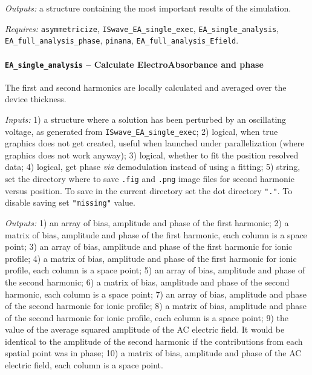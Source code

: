 		\textit{Outputs:} a structure containing the most important results of the simulation.

		\textit{Requires:} \texttt{asymmetricize}, \texttt{IS\-wave\_EA\_single\_exec},
		\texttt{EA\_single\_analysis}, \texttt{EA\_full\_analysis\_phase}, \texttt{pinana}, \texttt{EA\_full\_analysis\_Efield}.


		\paragraph{\texttt{EA\_single\_analysis} -- Calculate ElectroAbsorbance and phase}
		The first and second harmonics are locally calculated and averaged over the device thickness.

		\textit{Inputs:} 1) a structure where a solution has been perturbed by an
		oscillating voltage, as generated from \texttt{IS\-wave\_EA\_single\_exec};
		2) logical, when true graphics does not get created, useful when
		launched under parallelization (where graphics does not work anyway);
		3) logical, whether to fit the position resolved data;
		4) logical, get phase \textsl{via} demodulation instead of using a fitting;
		5) string, set the directory where to save \texttt{.fig} and \texttt{.png}
		image files for second harmonic versus position.
		To save in the current directory set the dot directory \texttt{"."}.
		To disable saving set \texttt{"missing"} value.

		\textit{Outputs:} 1) an array of bias, amplitude and phase of the first
		harmonic;
		2) a matrix of bias, amplitude and phase of the first
		harmonic, each column is a space point;
		3) an array of bias, amplitude and phase of the first
		harmonic for ionic profile;
		4) a matrix of bias, amplitude and phase of the first
		harmonic for ionic profile, each column is a space point;
		5) an array of bias, amplitude and phase of the second
		harmonic;
		6) a matrix of bias, amplitude and phase of the second
		harmonic, each column is a space point;
		7) an array of bias, amplitude and phase of the second
		harmonic for ionic profile;
		8) a matrix of bias, amplitude and phase of the second
		harmonic for ionic profile, each column is a space point;
		9) the value of the average squared amplitude of the
		AC electric field. It would be identical to the amplitude of the
		second harmonic if the contributions from each spatial point was in
		phase;
		10) a matrix of bias, amplitude and phase of the AC electric
		field, each column is a space point.

